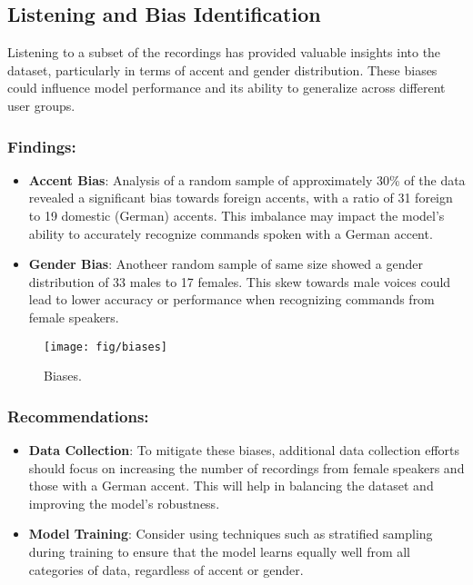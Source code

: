 \subsection{Listening and Bias Identification}

Listening to a subset of the recordings has provided valuable insights into the dataset, particularly in terms of accent and gender distribution. These biases could influence model performance and its ability to generalize across different user groups.

\subsubsection{Findings:}

\begin{itemize}
    \item \textbf{Accent Bias}: Analysis of a random sample of approximately 30\% of the data
    revealed a significant bias towards foreign accents, with a ratio of 31 foreign to
    19 domestic (German) accents.
    This imbalance may impact the model’s ability to accurately recognize commands spoken
    with a German accent.
    \item \textbf{Gender Bias}: Anotheer random sample of same size showed a gender distribution of 33 males to 17 females. This skew towards male voices could lead to lower accuracy or performance when recognizing commands from female speakers.
\end{itemize}

\begin{figure}[!ht]
	\centering
	\texttt{[image: fig/biases]}
	\vspace{-0.3cm}
	\caption{Biases.}
	\label{fig:Biases}
	\vspace{-0.1cm}
\end{figure}


\subsubsection{Recommendations:}

\begin{itemize}
    \item \textbf{Data Collection}: To mitigate these biases, additional data collection efforts should focus on increasing the number of recordings from female speakers and those with a German accent. This will help in balancing the dataset and improving the model's robustness.
    \item \textbf{Model Training}: Consider using techniques such as stratified sampling during training to ensure that the model learns equally well from all categories of data, regardless of accent or gender.
\end{itemize}


